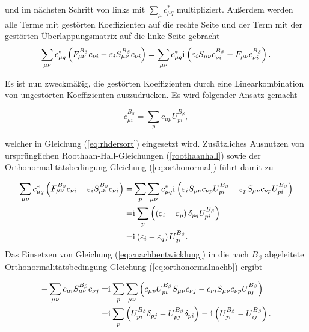     und im nächsten Schritt von links mit $\sum_{\mu}c_{\mu q}^*$ multipliziert. Außerdem werden alle Terme mit gestörten Koeffizienten auf die rechte Seite und der Term mit der gestörten Überlappungsmatrix auf die linke Seite gebracht 
    \begin{equation}\label{eq:rhdersort}
	\sum_{\mu\nu}c_{\mu q}^*\left(F_{\mu\nu}^{B_\beta}c_{\nu i}-\varepsilon_i S_{\mu\nu}^{B_\beta}c_{\nu i}\right)=\sum_{\mu\nu}c_{\mu q}^*\mathrm{i}\mkern1mu\left(\varepsilon_i S_{\mu\nu}c_{\nu i}^{B_\beta}-F_{\mu\nu}c_{\nu i}^{B_\beta}\right).
	\end{equation}
	
	Es ist nun zweckmäßig, die gestörten Koeffizienten durch eine Linearkombination von ungestörten Koeffizienten auszudrücken. Es wird folgender Ansatz gemacht
	
	\begin{equation}\label{eq:cnachbentwicklung}
	c_{\mu i}^{B_\beta}=\sum_{p}c_{\mu p} U_{pi}^{B_\beta},
	\end{equation}
	
	welcher in Gleichung (\ref{eq:rhdersort}) eingesetzt wird. Zusätzliches Ausnutzen von ursprünglichen Roothaan-Hall-Gleichungen (\ref{roothaanhall}) sowie der Orthonormalitätsbedingung Gleichung (\ref{eq:orthonormal}) führt damit zu
	
    \begin{equation}\label{eq:cphfupi}
    \begin{aligned}
	\sum_{\mu\nu}c_{\mu q}^*\left(F_{\mu\nu}^{B_\beta}c_{\nu i}-\varepsilon_i S_{\mu\nu}^{B_\beta}c_{\nu i}\right)=&\sum_p\sum_{\mu\nu}c_{\mu q}^*\mathrm{i}\mkern1mu\left(\varepsilon_i S_{\mu\nu}c_{\nu p}U_{pi}^{B_\beta}-\varepsilon_p S_{\mu\nu}c_{\nu p}U_{pi}^{B_\beta}\right)\\
	=&\mathrm{i}\mkern1mu\sum_p\left(\left(\varepsilon_i-\varepsilon_p\right)\delta_{pq}U_{pi}^{B_\beta}\right)\\
	=&\mathrm{i}\mkern1mu\left(\varepsilon_i-\varepsilon_q\right)U_{qi}^{B_\beta}.
	\end{aligned}
	\end{equation}	
	Das Einsetzen von Gleichung (\ref{eq:cnachbentwicklung}) in die nach $B_\beta$ abgeleitete Orthonormalitätsbedingung Gleichung (\ref{eq:orthonormalnachb}) ergibt 
	
	\begin{equation}\label{eq:cphfuji}
	\begin{aligned}
	-\sum_{\mu\nu}c_{\mu i}S_{\mu\nu}^{B_\beta}c_{\nu j}=&\mathrm{i}\mkern1mu\sum_p\sum_{\mu\nu}\left(c_{\mu p}U_{pi}^{B_\beta}S_{\mu\nu}c_{\nu j}-c_{\nu i}S_{\mu\nu}c_{\nu p}U_{pj}^{B_\beta}\right)\\
	=&\mathrm{i}\mkern1mu\sum_p\left(U_{pi}^{B_\beta}\delta_{pj}-U_{pj}^{B_\beta}\delta_{pi}\right)=\mathrm{i}\mkern1mu\left(U_{ji}^{B_\beta}-U_{ij}^{B_\beta}\right).
	\end{aligned}
	\end{equation}
    
